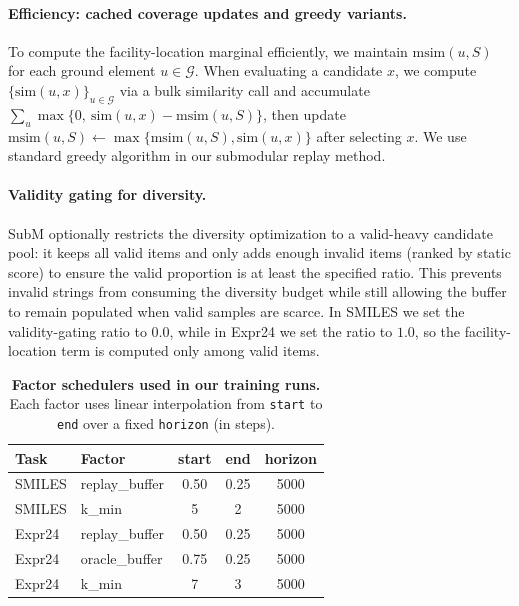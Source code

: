 \documentclass{article}
\theoremstyle{plain}
\theoremstyle{definition}
\theoremstyle{remark}
\begin{document}
\paragraph{Efficiency: cached coverage updates and greedy variants.}
To compute the facility-location marginal efficiently, we maintain $\mathrm{msim}(u,S)$ for each ground element $u\in\mathcal{G}$.
When evaluating a candidate $x$, we compute $\{\mathrm{sim}(u,x)\}_{u\in\mathcal{G}}$ via a bulk similarity call and accumulate
$\sum_u \max\{0,\ \mathrm{sim}(u,x)-\mathrm{msim}(u,S)\}$, then update $\mathrm{msim}(u,S)\leftarrow\max\{\mathrm{msim}(u,S),\mathrm{sim}(u,x)\}$ after selecting $x$.
We use standard greedy algorithm in our submodular replay method.

\paragraph{Validity gating for diversity.}
SubM optionally restricts the diversity optimization to a valid-heavy candidate pool: it keeps all valid items and only adds enough invalid items (ranked by static score)
to ensure the valid proportion is at least the specified ratio.
This prevents invalid strings from consuming the diversity budget while still allowing the buffer to remain populated
when valid samples are scarce.
In SMILES we set the validity-gating ratio to $0.0$, while in Expr24 we set the ratio to $1.0$, so the facility-location term is computed only among valid items.

\begin{table}[!htbp]
\centering
\small
\setlength{\tabcolsep}{5pt}
\renewcommand{\arraystretch}{1.10}
\caption{\textbf{Factor schedulers used in our training runs.}
Each factor uses linear interpolation from \texttt{start} to \texttt{end} over a fixed \texttt{horizon} (in steps).
}
\label{tab:repro_schedulers}
\vspace{-0.25em}
\begin{tabular}{llccc}
\toprule
Task & Factor & start & end & horizon \\
\midrule
SMILES & replay\_buffer & 0.50 & 0.25 & 5000 \\
SMILES & k\_min & 5 & 2 & 5000 \\
\midrule
Expr24 & replay\_buffer & 0.50 & 0.25 & 5000 \\
Expr24 & oracle\_buffer & 0.75 & 0.25 & 5000 \\
Expr24 & k\_min & 7 & 3 & 5000 \\
\bottomrule
\end{tabular}
\end{table}
\end{document}
